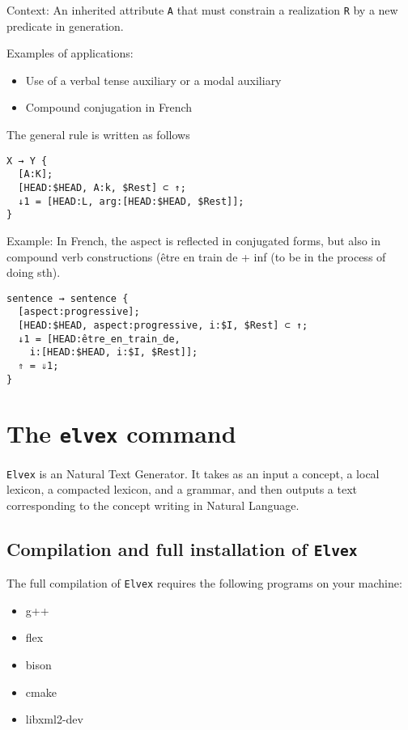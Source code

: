 \documentclass[11pt]{article}
\begin{document}
Context:
An inherited attribute \texttt{A} that must constrain a realization
\texttt{R} by a new predicate in generation.

Examples of applications:
\begin{itemize}
\item Use of a verbal tense auxiliary or a modal auxiliary
\item Compound conjugation in French
\end{itemize}

The general rule is written as follows

\begin{lstlisting}
X → Y {
  [A:K];
  [HEAD:$HEAD, A:k, $Rest] ⊂ ↑;
  ↓1 = [HEAD:L, arg:[HEAD:$HEAD, $Rest]];
}

\end{lstlisting}

Example:
In French, the aspect is reflected in conjugated forms, but also in
compound verb constructions (\og être en train de + inf\fg{} (to be in the
process of doing sth). 

\begin{lstlisting}
sentence → sentence {
  [aspect:progressive];
  [HEAD:$HEAD, aspect:progressive, i:$I, $Rest] ⊂ ↑;
  ↓1 = [HEAD:être_en_train_de, 
	i:[HEAD:$HEAD, i:$I, $Rest]];
  ⇑ = ⇓1;
}
\end{lstlisting}

\section{The \texttt{elvex} command}

\texttt{Elvex} is an Natural Text Generator. It takes as an input a
concept, a local lexicon, a compacted lexicon, and a grammar, and then
outputs a text corresponding to the concept writing in Natural
Language.

\subsection*{Compilation and full installation of \texttt{Elvex}}

The full compilation of \texttt{Elvex} requires the following programs on your machine:

\begin{itemize}
\item g++
\item flex
\item bison
\item cmake
\item libxml2-dev
\end{itemize}
\end{document}
